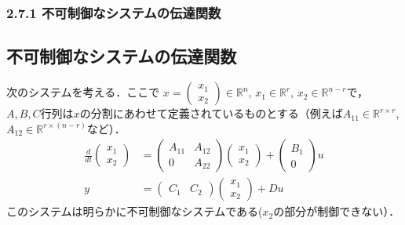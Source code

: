 \begin{frame}[t]
\frametitle{2.7.1 不可制御なシステムの伝達関数}
\subsection{不可制御なシステムの伝達関数}

次のシステムを考える．ここで
$x = \left(\begin{array}{c} {x}_1 \\ {x}_2 \end{array}\right) \in {\mathbb R}^n$, 
$x_1 \in {\mathbb R}^r$, $x_2 \in {\mathbb R}^{n-r}$で，$A,B,C$行列は$x$の分割にあわせて定義されているものとする（例えば$A_{11} \in {\mathbb R}^{r \times r}$, $A_{12} \in {\mathbb R}^{r \times (n-r)}$など）．
\begin{align}
 \frac{d}{dt}
  \left(\begin{array}{c}
         {x}_1 \\
	 {x}_2 
	\end{array}\right)
  &=
  \left(\begin{array}{cc}
         {A}_{11} & {A}_{12} \\
	     0        & {A}_{22}
	\end{array}\right)
  \left(\begin{array}{c}
         {x}_1 \\
	 {x}_2 
	\end{array}\right)
  +
  \left(\begin{array}{c}
         {B}_1 \\
	 0
	\end{array}\right)
  u \\
 y &=
  \left(\begin{array}{cc}
         {C}_1 & {C}_2 
	\end{array}\right)
  \left(\begin{array}{c}
         {x}_1 \\
	 {x}_2 
	\end{array}\right)
  + D u
\end{align}
このシステムは明らかに不可制御なシステムである($x_2$の部分が制御できない）．
\end{frame}

